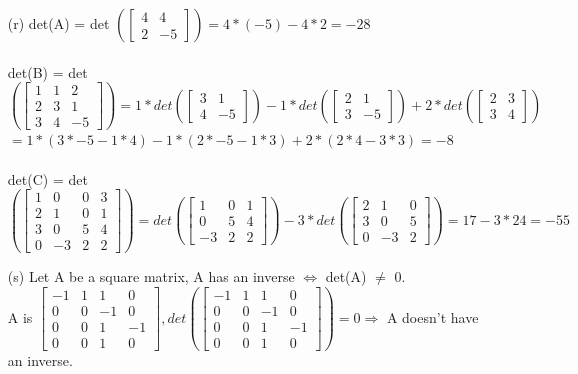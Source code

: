 \documentclass[a4paper]{article}
\begin{document}
\begin{itemize}
\item[(r)] det(A) = det
$
(
\begin{bmatrix} 
4 & 4\\
2 & -5 
\end{bmatrix}
) = 4*(-5) - 4*2 = -28
$\\\\
det(B) = det
$
(
\begin{bmatrix} 
1 & 1 & 2\\
2 & 3 & 1\\
3 & 4 & -5
\end{bmatrix}
) = 
1 * det(
\begin{bmatrix} 
3 & 1\\
4 & -5 
\end{bmatrix}
)
-1* det(
\begin{bmatrix} 
2 & 1\\
3 & -5 
\end{bmatrix}
) + 
2 * det(
\begin{bmatrix} 
2 & 3\\
3 & 4 
\end{bmatrix}
)
$\\
$=
1 *(3 * −5 − 1 * 4) − 1 *(2 * −5 − 1 * 3) + 2 * (2 * 4 − 3 * 3) = -8
$\\\\
det(C) = det
$
(
\begin{bmatrix} 
1 & 0 & 0 & 3\\
2 & 1 & 0 & 1\\
3 & 0 & 5 & 4\\
0 & -3 & 2 & 2
\end{bmatrix}
)
= 
det(
\begin{bmatrix} 
1 & 0 & 1\\
0 & 5 & 4\\
-3 & 2 & 2
\end{bmatrix}
)
-3 * det(
\begin{bmatrix} 
2 & 1 & 0 \\
3 & 0 & 5 \\
0 & -3 & 2
\end{bmatrix}
) = 17 - 3* 24 = -55
$
\item[(s)] Let A be a square matrix, A has an inverse $\Leftrightarrow$ det(A) $\neq$ 0.\\
A is
$
\begin{bmatrix} 
-1 & 1 & 1 & 0 \\
0 & 0 & -1 & 0 \\
0 & 0 & 1 & -1 \\
0 & 0 & 1 & 0 
\end{bmatrix},
det(
\begin{bmatrix} 
-1 & 1 & 1 & 0 \\
0 & 0 & -1 & 0 \\
0 & 0 & 1 & -1 \\
0 & 0 & 1 & 0 
\end{bmatrix}
)= 0 \Rightarrow
$ A doesn't have an inverse.
\end{itemize}
\end{document}
